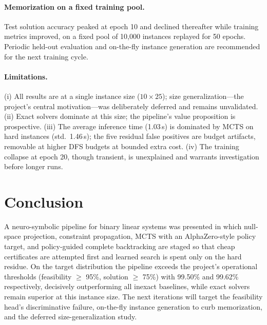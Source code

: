 \documentclass[12pt]{article}
\begin{document}
\paragraph{Memorization on a fixed training pool.} Test solution accuracy peaked at epoch 10 and declined thereafter while training metrics improved, on a fixed pool of 10{,}000 instances replayed for 50 epochs. Periodic held-out evaluation and on-the-fly instance generation are recommended for the next training cycle.

\paragraph{Limitations.} (i) All results are at a single instance size ($10 \times 25$); size generalization---the project's central motivation---was deliberately deferred and remains unvalidated. (ii) Exact solvers dominate at this size; the pipeline's value proposition is prospective. (iii) The average inference time (1.03\,s) is dominated by MCTS on hard instances (std.\ 1.46\,s); the five residual false positives are budget artifacts, removable at higher DFS budgets at bounded extra cost. (iv) The training collapse at epoch 20, though transient, is unexplained and warrants investigation before longer runs.

\section{Conclusion}

A neuro-symbolic pipeline for binary linear systems was presented in which null-space projection, constraint propagation, MCTS with an AlphaZero-style policy target, and policy-guided complete backtracking are staged so that cheap certificates are attempted first and learned search is spent only on the hard residue. On the target distribution the pipeline exceeds the project's operational thresholds (feasibility $\geq$ 95\%, solution $\geq$ 75\%) with 99.50\% and 99.62\% respectively, decisively outperforming all inexact baselines, while exact solvers remain superior at this instance size. The next iterations will target the feasibility head's discriminative failure, on-the-fly instance generation to curb memorization, and the deferred size-generalization study.
\end{document}
